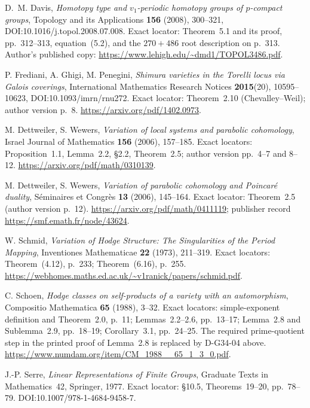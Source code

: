 D.~M. Davis, \emph{Homotopy type and \(v_1\)-periodic homotopy groups of
\(p\)-compact groups}, Topology and its Applications \textbf{156} (2008),
300--321, DOI:10.1016/j.topol.2008.07.008.
Exact locator: Theorem~5.1 and its proof, pp.~312--313, equation~(5.2),
and the \(270+486\) root description on p.~313.
Author's published copy: \url{https://www.lehigh.edu/~dmd1/TOPOL3486.pdf}.

P. Frediani, A. Ghigi, M. Penegini, \emph{Shimura varieties in the Torelli
locus via Galois coverings}, International Mathematics Research Notices
\textbf{2015}(20), 10595--10623, DOI:10.1093/imrn/rnu272.
Exact locator: Theorem~2.10 (Chevalley--Weil); author version p.~8.
\url{https://arxiv.org/pdf/1402.0973}.

M. Dettweiler, S. Wewers, \emph{Variation of local systems and parabolic
cohomology}, Israel Journal of Mathematics \textbf{156} (2006), 157--185.
Exact locators: Proposition~1.1, Lemma~2.2, \S2.2, Theorem~2.5;
author version pp.~4--7 and 8--12.
\url{https://arxiv.org/pdf/math/0310139}.

M. Dettweiler, S. Wewers, \emph{Variation of parabolic cohomology and
Poincar\'e duality}, S\'eminaires et Congr\`es \textbf{13} (2006), 145--164.
Exact locator: Theorem~2.5 (author version p.~12).
\url{https://arxiv.org/pdf/math/0411119};
publisher record \url{https://smf.emath.fr/node/43624}.

W. Schmid, \emph{Variation of Hodge Structure: The Singularities of the
Period Mapping}, Inventiones Mathematicae \textbf{22} (1973), 211--319.
Exact locators: Theorem~(4.12), p.~233; Theorem~(6.16), p.~255.
\url{https://webhomes.maths.ed.ac.uk/~v1ranick/papers/schmid.pdf}.

C. Schoen, \emph{Hodge classes on self-products of a variety with an
automorphism}, Compositio Mathematica \textbf{65} (1988), 3--32.
Exact locators: simple-exponent definition and Theorem~2.0, p.~11;
Lemmas~2.2--2.6, pp.~13--17; Lemma~2.8 and Sublemma~2.9, pp.~18--19;
Corollary~3.1, pp.~24--25.  The required prime-quotient step in the printed
proof of Lemma~2.8 is replaced by D-G34-04 above.
\url{https://www.numdam.org/item/CM_1988__65_1_3_0.pdf}.

J.-P. Serre, \emph{Linear Representations of Finite Groups}, Graduate Texts
in Mathematics~42, Springer, 1977.  Exact locator: \S10.5, Theorems~19--20,
pp.~78--79.  DOI:10.1007/978-1-4684-9458-7.

